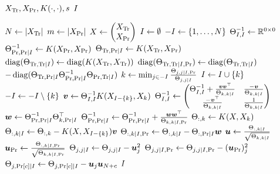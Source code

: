 \begin{algorithmic}[1]
  \REQUIRE \( X_{\text{Tr}}, X_{\text{Pr}}, K(\cdot, \cdot), s \)
  \ENSURE \( I \)

  \STATE \( N \gets \lvert X_{\text{Tr}}\rvert \)
  \STATE \( m \gets \lvert X_{\text{Pr}}\rvert \)
  \STATE \(
    X \gets
    \begin{pmatrix}
      X_{\text{Tr}} \\
      X_{\text{Pr}}
    \end{pmatrix}
  \)
  \STATE \( I \gets \emptyset \)
  \STATE \( -I \gets \{ 1, \dotsc, N \} \)
  \STATE \( \Theta_{I, I}^{-1} \gets \mathbb{R}^{0 \times 0} \)
  \STATE \(
    \Theta_{\text{Pr}, \text{Pr} \mid I}^{-1} \gets
    K(X_{\text{Pr}}, X_{\text{Pr}})
  \)
  \STATE \(
    \Theta_{\text{Tr}, \text{Pr} \mid I} \gets
    K(X_{\text{Tr}}, X_{\text{Pr}})
  \)
  \STATE \(
    \operatorname{diag}(\Theta_{\text{Tr}, \text{Tr} \mid I}) \gets
    \operatorname{diag}(K(X_{\text{Tr}}, X_{\text{Tr}}))
  \)
  \STATE \(
    \operatorname{diag}(\Theta_{\text{Tr}, \text{Tr} \mid I, \text{Pr}}) \gets
    \operatorname{diag}(\Theta_{\text{Tr}, \text{Tr} \mid I})
  \) \\  \(
    - \operatorname{diag}(
      \Theta_{\text{Tr}, \text{Pr} \mid I}
      \Theta_{\text{Pr}, \text{Pr} \mid I}^{-1}
      \Theta_{\text{Pr}, \text{Tr} \mid I}
    )
  \)
    \STATE \(
      k \gets \min_{j \in -I}
      \frac{\Theta_{j, j \mid I, \text{Pr}}}{\Theta_{j, j \mid I}}
    \)
    \STATE \( I \gets I \cup \{ k \} \)
    \STATE \( -I \gets -I \setminus \{ k \} \)
    \STATE \( \bm{v} \gets \Theta_{I, I}^{-1} K(X_{I - \{ k \}}, X_k) \)
    \STATE \(
      \Theta_{I, I}^{-1} \gets
      \begin{pmatrix}
        \Theta_{I, I}^{-1} +
        \frac{\bm{v} \bm{v}^{\top}}{\Theta_{k, k \mid I}} &
        \frac{-\bm{v}}{\Theta_{k, k \mid I}} \\
        \frac{-\bm{v}^{\top}}{\Theta_{k, k \mid I}} &
        \frac{1}{\Theta_{k, k \mid I}}
      \end{pmatrix}
    \)
    \STATE \(
      \bm{w} \gets \Theta_{\text{Pr}, \text{Pr} \mid I}^{-1}
      \Theta_{k, \text{Pr} \mid I}^{\top}
    \)
    \STATE \(
      \Theta_{\text{Pr}, \text{Pr} \mid I}^{-1} \gets
      \Theta_{\text{Pr}, \text{Pr} \mid I}^{-1} +
      \frac{\bm{w} \bm{w}^{\top}}{\Theta_{k, k \mid I, \text{Pr}}}
    \)
    \STATE \( \Theta_{:, k} \gets K(X, X_k) \)
    \STATE \(
      \Theta_{:, k \mid I} \gets
      \Theta_{:, k} -
      K(X, X_{I - \{ k \}}) \bm{v}
    \)
    \STATE \(
      \Theta_{:, k \mid I, \text{Pr}} \gets
      \Theta_{:, k \mid I} -
      \Theta_{:, \text{Pr} \mid I} \bm{w}
    \)
    \STATE \(
      \bm{u} \gets
      \frac{\Theta_{:, k \mid I}}{\sqrt{\Theta_{k, k \mid I}}}
    \)
    \STATE \(
      \bm{u}_{\text{Pr}} \gets
      \frac{\Theta_{:, k \mid I, \text{Pr}}}
            {\sqrt{\Theta_{k, k \mid I, \text{Pr}}}}
    \)
      \STATE \(
        \Theta_{j, j \mid I} \gets
        \Theta_{j, j \mid I} -
        \bm{u}_j^2
      \)
      \STATE \(
        \Theta_{j, j \mid I, \text{Pr}} \gets
        \Theta_{j, j \mid I, \text{Pr}} -
        (\bm{u}_{\text{Pr}})_j^2
      \)
        \STATE \(
          \Theta_{j, \text{Pr}[c] \mid I} \gets
          \Theta_{j, \text{Pr}[c] \mid I} -
          \bm{u}_j \bm{u}_{N + c}
        \)
      \ENDFOR
    \ENDFOR
  \ENDWHILE
  \RETURN \( I \)
\end{algorithmic}
